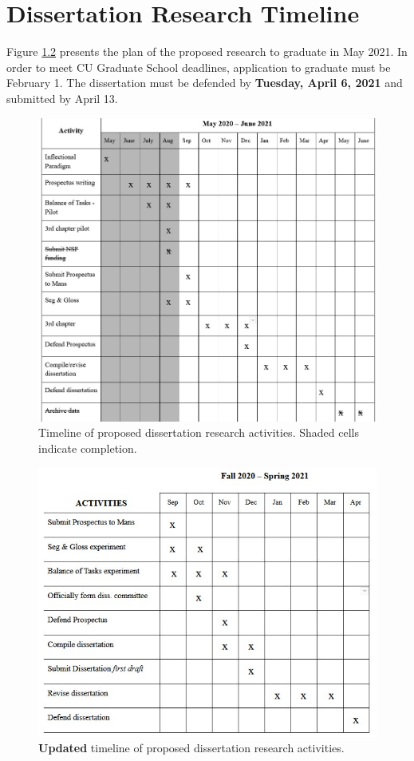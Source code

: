 \chapter{Dissertation Research Timeline}
\label{chap:timeline}

Figure \ref{fig:timeline} presents the plan of the proposed research to graduate in May 2021. In order to meet CU Graduate School deadlines, application to graduate must be February 1. The dissertation must be defended by \textbf{Tuesday, April 6, 2021} and submitted by April 13.

\begin{figure}[H]
    \centering
    \includegraphics[width=13.25cm]{figs/Timeline.jpg}
    \caption[Timeline]{Timeline of proposed dissertation research activities. Shaded cells indicate completion.}
    \label{fig:timeline}
\end{figure}

\begin{figure}[H]
    \centering
    \includegraphics[width=15cm]{figs/TimelineUpdated.jpg}
    \caption[Timeline]{\textbf{Updated} timeline of proposed dissertation research activities.}
    \label{fig:timeline}
\end{figure}